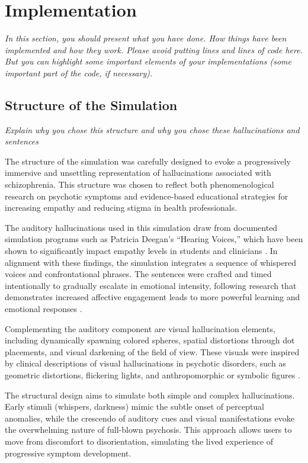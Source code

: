 \chapter{Implementation}
\label{ch:implementation}

\emph{In this section, you should present what you have done. How things have been implemented and how they work.
Please avoid putting lines and lines of code here. But you can highlight some important elements of your implementations (some important part of the code, if necessary).}

\section{Structure of the Simulation}
\emph{Explain why you chose this structure and why you chose these hallucinations and sentences}

The structure of the simulation was carefully designed to evoke a progressively immersive and unsettling representation of hallucinations associated with schizophrenia. This structure was chosen to reflect both phenomenological research on psychotic symptoms and evidence-based educational strategies for increasing empathy and reducing stigma in health professionals.

The auditory hallucinations used in this simulation draw from documented simulation programs such as Patricia Deegan’s “Hearing Voices,” which have been shown to significantly impact empathy levels in students and clinicians \cite{Hsia2022}. In alignment with these findings, the simulation integrates a sequence of whispered voices and confrontational phrases. The sentences were crafted and timed intentionally to gradually escalate in emotional intensity, following research that demonstrates increased affective engagement leads to more powerful learning and emotional responses \cite{Skoy2016}.

Complementing the auditory component are visual hallucination elements, including dynamically spawning colored spheres, spatial distortions through dot placements, and visual darkening of the field of view. These visuals were inspired by clinical descriptions of visual hallucinations in psychotic disorders, such as geometric distortions, flickering lights, and anthropomorphic or symbolic figures \cite{Silverstein2021,Vanommen2019}.

The structural design aims to simulate both simple and complex hallucinations. Early stimuli (whispers, darkness) mimic the subtle onset of perceptual anomalies, while the crescendo of auditory cues and visual manifestations evoke the overwhelming nature of full-blown psychosis. This approach allows users to move from discomfort to disorientation, simulating the lived experience of progressive symptom development.

